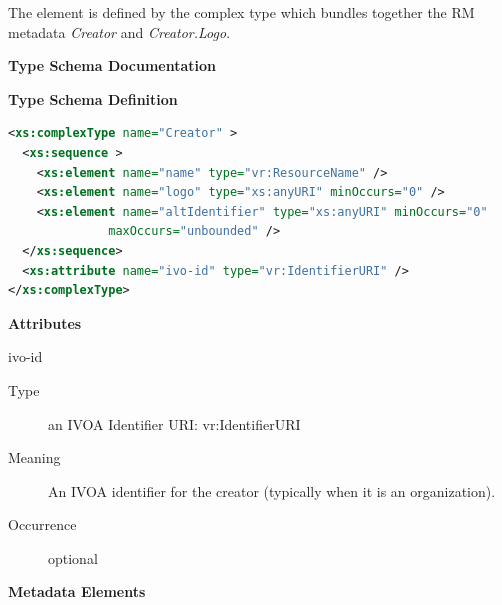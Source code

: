 \documentclass[11pt,a4paper]{ivoa}
\begin{document}


The  element is defined by the  complex
type which bundles together the RM metadata \emph{Creator} and
\emph{Creator.Logo}.



\begin{generated}
\begingroup
      	\renewcommand*\descriptionlabel[1]{%
      	\hbox to 5.5em{\emph{#1}\hfil}}\vspace{2ex}\noindent\textbf{ Type Schema Documentation}


\vspace{1ex}\noindent\textbf{ Type Schema Definition}

\begin{lstlisting}[language=XML,basicstyle=\footnotesize]
<xs:complexType name="Creator" >
  <xs:sequence >
    <xs:element name="name" type="vr:ResourceName" />
    <xs:element name="logo" type="xs:anyURI" minOccurs="0" />
    <xs:element name="altIdentifier" type="xs:anyURI" minOccurs="0"
              maxOccurs="unbounded" />
  </xs:sequence>
  <xs:attribute name="ivo-id" type="vr:IdentifierURI" />
</xs:complexType>
\end{lstlisting}

\vspace{0.5ex}\noindent\textbf{ Attributes}

\begingroup\small\begin{bigdescription}
\item[ivo-id]
\begin{description}
\item[Type] an IVOA Identifier URI: vr:IdentifierURI
\item[Meaning] 
             An IVOA identifier for the creator (typically when it is
             an organization).
           
\item[Occurrence] optional

\end{description}


\end{bigdescription}\endgroup



\vspace{0.5ex}\noindent\textbf{ Metadata Elements}


\end{generated}
\end{document}
